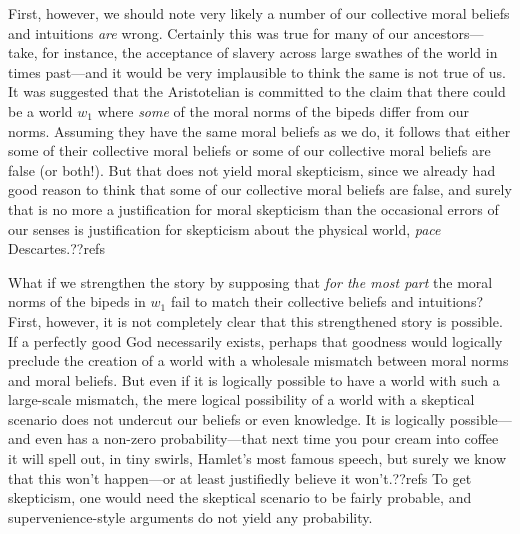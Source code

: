 First, however, we should note very likely a number of our collective moral beliefs and intuitions \textit{are}
wrong. Certainly this was true for many of our ancestors---take, for instance, the acceptance of
slavery across large swathes of the world in times past---and it would be very implausible to think the 
same is not true of us. It was suggested that the Aristotelian is committed to the claim that there could be a world
$w_1$ where \textit{some} of the moral norms of the bipeds differ from our norms. Assuming they have the same 
moral beliefs as we do, it follows that either some of their collective moral beliefs or some of our collective 
moral beliefs are false (or both!). But that does not yield moral skepticism, since we already had good reason to think
that some of our collective moral beliefs are false, and surely that is no more a justification for moral skepticism than
the occasional errors of our senses is justification for skepticism about the physical world, \textit{pace} Descartes.??refs

What if we strengthen the story by supposing that \textit{for the most part} the moral norms of the bipeds 
in $w_1$ fail to match their collective beliefs and intuitions? First, however, it is not completely clear that this
strengthened story is possible. If a perfectly good God necessarily exists, perhaps that goodness would logically preclude the 
creation of a world with a wholesale mismatch between moral norms and moral beliefs. 
But even if it is logically possible to have a world with such a large-scale mismatch, the mere logical 
possibility of a world with a skeptical scenario does not undercut our beliefs or even knowledge. 
It is logically possible---and even has a non-zero probability---that next time you pour cream into coffee
it will spell out, in tiny swirls, Hamlet's most famous speech, but surely we know that this won't happen---or at 
least justifiedly believe it won't.??refs To get skepticism, one would need the skeptical scenario to be fairly
probable, and supervenience-style arguments do not yield any probability.


